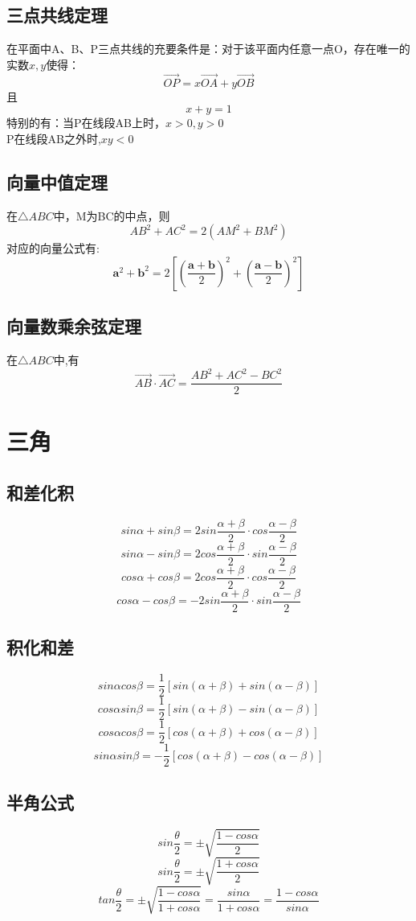 \documentclass[UTF8]{ctexart}
\begin{document}
		\subsection{三点共线定理}
			在平面中A、B、P三点共线的充要条件是：对于该平面内任意一点O，存在唯一的实数$x,y$使得：
			\[\overrightarrow{OP}=x\overrightarrow{OA}+y\overrightarrow{OB} \]
			且
			\[x+y=1\]
			特别的有：当P在线段AB上时，$x>0,y>0$\\
			P在线段AB之外时,$xy<0$
		\subsection{向量中值定理}
			在$\triangle ABC$中，M为BC的中点，则
			\[AB^2+AC^2=2(AM^2+BM^2)\]
			对应的向量公式有:
			\[\boldsymbol{a}^2+\boldsymbol{b}^2=2\left[\left(\frac{\boldsymbol{a}+\boldsymbol{b}}{2}\right)^2 + \left(\frac{\boldsymbol{a}-\boldsymbol{b}}{2}\right)^2 \right] \]
		\subsection{向量数乘余弦定理}
			在$\triangle ABC$中,有
			\[\overrightarrow{AB}\cdot \overrightarrow{AC}=\frac{AB^2+AC^2-BC^2}{2}\]
	\section{三角}
		\subsection{和差化积}
			\[sin\alpha+sin\beta=2sin\frac{\alpha+\beta}{2}\cdot cos\frac{\alpha-\beta}{2}\]
			\[sin\alpha-sin\beta=2cos\frac{\alpha+\beta}{2}\cdot sin\frac{\alpha-\beta}{2}\]
			\[cos\alpha+cos\beta=2cos\frac{\alpha+\beta}{2}\cdot cos\frac{\alpha-\beta}{2}\]
			\[cos\alpha-cos\beta=-2sin\frac{\alpha+\beta}{2}\cdot sin\frac{\alpha-\beta}{2}\]
		\subsection{积化和差}
			\[sin\alpha cos\beta=\frac{1}{2}\left[sin(\alpha+\beta)+sin(\alpha-\beta)\right]\]
			\[cos\alpha sin\beta=\frac{1}{2}\left[sin(\alpha+\beta)-sin(\alpha-\beta)\right]\]
			\[cos\alpha cos\beta=\frac{1}{2}\left[cos(\alpha+\beta)+cos(\alpha-\beta)\right]\]
			\[sin\alpha sin\beta=-\frac{1}{2}\left[cos(\alpha+\beta)-cos(\alpha-\beta)\right]\]
		\subsection{半角公式}
			\[sin\frac{\theta}{2}=\pm \sqrt{\frac{1-cos\alpha}{2}}\]
			\[sin\frac{\theta}{2}=\pm \sqrt{\frac{1+cos\alpha}{2}}\]
			\[tan\frac{\theta}{2}=\pm \sqrt{\frac{1-cos\alpha}{1+cos\alpha}}=\frac{sin\alpha}{1+cos\alpha}=\frac{1-cos\alpha}{sin\alpha}\]
\end{document}
